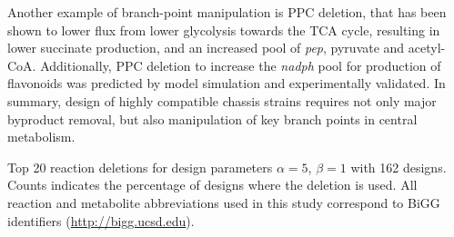 {Another example of branch-point manipulation is PPC deletion, that has been shown to lower flux from lower glycolysis towards the TCA cycle,\citep{de2006,peng2004} resulting in lower succinate production, and an increased pool of \textit{pep}, pyruvate and acetyl-CoA.
Additionally, PPC deletion to increase the \textit{nadph} pool for production of flavonoids was predicted by model simulation and experimentally validated. \citep{chemler2010}
In summary, design of highly compatible chassis strains requires not only major byproduct removal, but also manipulation of key branch points in central metabolism.

\begin{table}[ht]
    \caption[Top 20 reaction deletions]{Top 20 reaction deletions for design parameters $\alpha=5$, $\beta=1$ with 162 designs. Counts indicates the percentage of designs where the deletion is used. All reaction and metabolite abbreviations used in this study correspond to BiGG identifiers (\protect\url{http://bigg.ucsd.edu}).}
    \centering
    
    \label{tab7:top20deletions}
\end{table}






}
